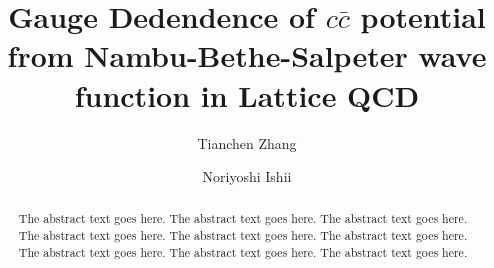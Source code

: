 \documentclass[preprint]{ptephy_v1} \preprintnumber{XXXX-XXXX}
\begin{document}
\title{Gauge Dedendence of $c\bar{c}$ potential from Nambu-Bethe-Salpeter wave function in Lattice QCD}

\author{Tianchen Zhang} \author{Noriyoshi Ishii}

\begin{abstract}%
    The abstract text goes here. The abstract text goes here. The abstract text goes here.
    The abstract text goes here. The abstract text goes here. The abstract text goes here.
    The abstract text goes here. The abstract text goes here. The abstract text goes here.
\end{abstract}
\maketitle



\let\doi\relax




\end{document}
